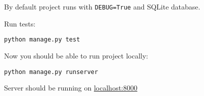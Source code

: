 {By default project runs with \texttt{DEBUG=True} and SQLite database.

Run tests:

\begin{verbatim}
python manage.py test
\end{verbatim}

Now you should be able to run project locally:

\begin{verbatim}
python manage.py runserver
\end{verbatim}

Server should be running on \href{http://localhost:8000}{localhost:8000}
}
